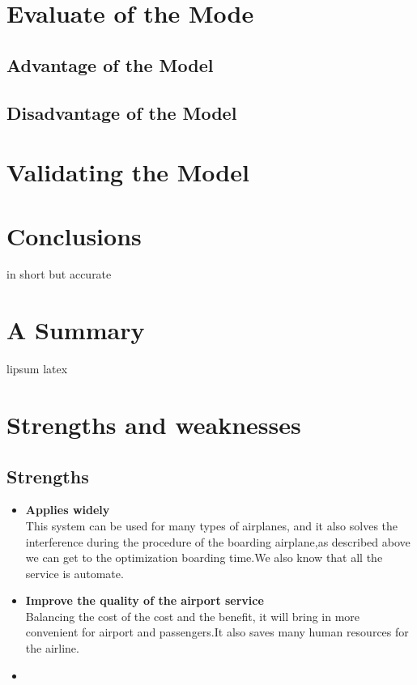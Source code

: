 \documentclass{mcmthesis}
\begin{document}
\section{Evaluate of the Mode}
\subsection{Advantage of the Model}
\subsection{Disadvantage of the Model}

\section{Validating the Model}


\section{Conclusions}
in short but accurate

\section{A Summary}
\lipsum[6]
lipsum latex

\section{Strengths and weaknesses}
\lipsum[12]

\subsection{Strengths}
\begin{itemize}
	\item \textbf{Applies widely}\\
	This  system can be used for many types of airplanes, and it also
	solves the interference during  the procedure of the boarding
	airplane,as described above we can get to the  optimization
	boarding time.We also know that all the service is automate.
	\item \textbf{Improve the quality of the airport service}\\
	Balancing the cost of the cost and the benefit, it will bring in
	more convenient  for airport and passengers.It also saves many
	human resources for the airline. \item \textbf{}
\end{itemize}
\end{document}
